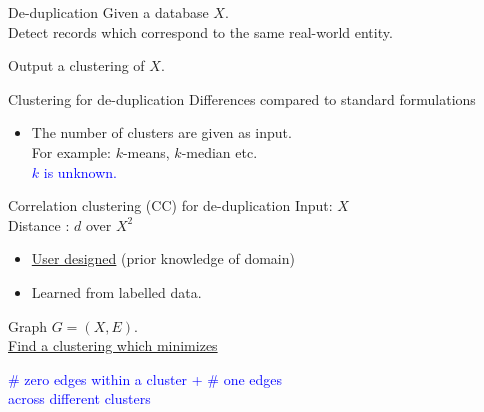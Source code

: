 \documentclass{beamer}
\begin{document}
\begin{frame}{De-duplication}
	\onslide<1->
    Given a database $X$. \\

    \vspace{10pt}\alert{Detect} records which correspond to the same real-world entity.
    
    \vspace{30pt}Output a clustering of $X$.
\end{frame}

\begin{frame}{Clustering for de-duplication}
	Differences compared to standard formulations\\
    \begin{itemize}
    	\vspace{10pt}\item The number of clusters are given as input. \\
    	For example: $k$-means, $k$-median etc.\\
    	\vspace{10pt}\textcolor{blue}{$k$ is unknown.}
	\end{itemize}    	
\end{frame}

\begin{frame}[label=CC]{Correlation clustering (CC) for de-duplication}
	Input: $X$\\
	Distance   : $d$ over $X^2$\\
	\begin{itemize}
		\item \hyperlink{notesCC}{User designed} (prior knowledge of domain) 
		\item Learned from labelled data.
	\end{itemize}
	 
	\vspace{20pt}Graph $G = (X, E)$. \\
    \vspace{10pt}\hyperlink{notesCCHardness}{Find a clustering which minimizes}
    
    \begin{center}
    \textcolor{blue}{\# zero edges within a cluster + \# one edges\\ across different clusters}
    \end{center}
    
\end{frame}
\end{document}
